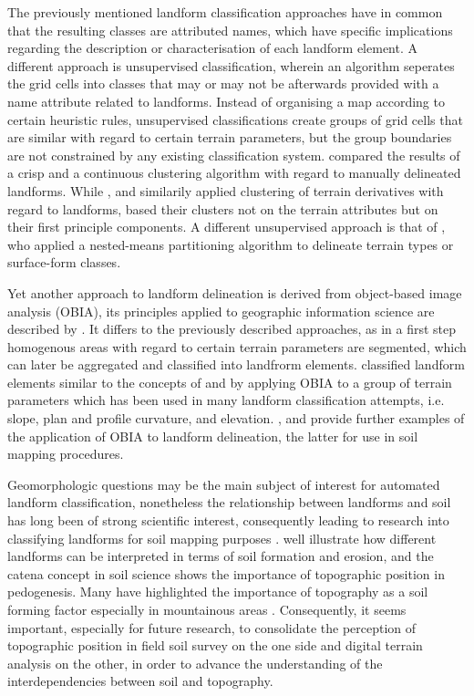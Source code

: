 \documentclass[preprint,12pt,authoryear]{elsarticle}
\begin{document}
The previously mentioned landform classification approaches have in common that the resulting classes  are attributed names, which have specific implications regarding the description or characterisation of each landform element. A different approach is unsupervised classification, wherein an algorithm seperates the grid cells into classes that may or may not be afterwards provided with a name attribute related to landforms. Instead of organising a map according to certain heuristic rules, unsupervised classifications create groups of grid cells that are similar with regard to certain terrain parameters, but the group boundaries are not constrained by any existing classification system. \cite{Irvin1997} compared the results of a crisp and a continuous clustering algorithm with regard to manually delineated landforms.  While \cite{Adediran2004}, \cite{Arrell2007} and \cite{Burrough2000a}  similarily applied clustering of terrain derivatives with regard to landforms, \cite{Moravej2012} based their clusters not on the terrain attributes but on their first principle components. A different unsupervised approach is that of  \cite{Iwahashi2007}, who applied a nested-means partitioning algorithm to delineate terrain types or surface-form classes.

Yet another approach to landform delineation is derived from object-based image analysis (OBIA), its principles applied to geographic information science are described by \cite{Blaschke2014}. It differs to the previously described approaches, as in a first step homogenous areas with regard to certain terrain parameters are segmented, which can later be aggregated and classified into landfrorm elements. \cite{Dragut2006} classified landform elements similar to the concepts of \cite{Dikau1988} and \cite{Pennock1987} by applying OBIA  to a group of terrain parameters which has been used in many landform classification attempts, i.e. slope, plan and profile curvature, and  elevation. \cite{Gercek2011}, \cite{Mashimbye2014} and \cite{Kringer2009}  provide further examples of the application of OBIA to landform delineation, the latter for use in soil mapping procedures.

Geomorphologic questions may be the main subject of interest for automated landform classification, nonetheless the relationship between landforms and soil has long been of strong scientific interest, consequently leading to research into classifying landforms for soil mapping purposes \citep{Schmidt2004,Herbst2012,Hughes2009, Barringer2008}. \cite{MacMillan2000a} well illustrate how different landforms can be interpreted in terms of soil formation and erosion, and the catena concept in soil science \citep{Schaetzl2013} shows the importance of topographic position in pedogenesis. Many have highlighted the importance of topography as a soil forming factor especially in mountainous areas \citep{Geitner2011,Herbst2012}. Consequently, it seems important, especially for future research, to consolidate the perception of topographic position in field soil survey on the one side and digital terrain analysis on the other, in order to advance the understanding of the interdependencies between soil and topography.
\end{document}
